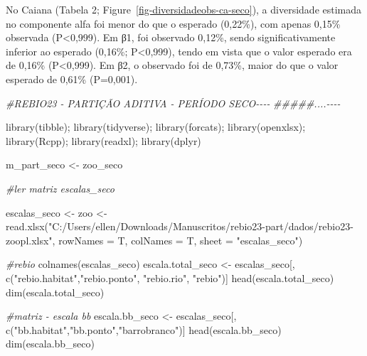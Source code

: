\documentclass[
  letterpaper,
  DIV=11,
  numbers=noendperiod]{scrartcl}
\newenvironment{Shaded}{}{}
\newcommand{\AttributeTok}[1]{\textcolor[rgb]{0.49,0.56,0.16}{#1}}
\newcommand{\CommentTok}[1]{\textcolor[rgb]{0.38,0.63,0.69}{\textit{#1}}}
\newcommand{\DocumentationTok}[1]{\textcolor[rgb]{0.73,0.13,0.13}{\textit{#1}}}
\newcommand{\FunctionTok}[1]{\textcolor[rgb]{0.02,0.16,0.49}{#1}}
\newcommand{\NormalTok}[1]{#1}
\newcommand{\OtherTok}[1]{\textcolor[rgb]{0.00,0.44,0.13}{#1}}
\newcommand{\StringTok}[1]{\textcolor[rgb]{0.25,0.44,0.63}{#1}}
\begin{document}
No Caiana (Tabela 2; Figure~\ref{fig-diversidadeobs-ca-seco}), a
diversidade estimada no componente alfa foi menor do que o esperado
(0,22\%), com apenas 0,15\% observada (P\textless0,999). Em β1, foi
observado 0,12\%, sendo significativamente inferior ao esperado (0,16\%;
P\textless0,999), tendo em vista que o valor esperado era de 0,16\%
(P\textless0,999). Em β2, o observado foi de 0,73\%, maior do que o
valor esperado de 0,61\% (P=0,001).

\begin{Shaded}
\begin{Highlighting}[numbers=left,,]
\CommentTok{\#REBIO23 {-} PARTIÇÃO ADITIVA {-} PERÍODO SECO{-}{-}{-}{-}}
\DocumentationTok{\#\#\#\#\#....{-}{-}{-}{-}}

\FunctionTok{library}\NormalTok{(tibble); }\FunctionTok{library}\NormalTok{(tidyverse); }\FunctionTok{library}\NormalTok{(forcats); }\FunctionTok{library}\NormalTok{(openxlsx); }\FunctionTok{library}\NormalTok{(Rcpp); }\FunctionTok{library}\NormalTok{(readxl); }\FunctionTok{library}\NormalTok{(dplyr)}

\NormalTok{m\_part\_seco }\OtherTok{\textless{}{-}}\NormalTok{ zoo\_seco}

\CommentTok{\#ler matriz escalas\_seco}

\NormalTok{escalas\_seco }\OtherTok{\textless{}{-}}\NormalTok{ zoo }\OtherTok{\textless{}{-}} \FunctionTok{read.xlsx}\NormalTok{(}\StringTok{"C:/Users/ellen/Downloads/Manuscritos/rebio23{-}part/dados/rebio23{-}zoopl.xlsx"}\NormalTok{,}
                                 \AttributeTok{rowNames =}\NormalTok{ T, }\AttributeTok{colNames =}\NormalTok{ T,}
                                 \AttributeTok{sheet =} \StringTok{"escalas\_seco"}\NormalTok{)}

\CommentTok{\#rebio}
\FunctionTok{colnames}\NormalTok{(escalas\_seco)}
\NormalTok{escala.total\_seco }\OtherTok{\textless{}{-}}\NormalTok{ escalas\_seco[, }\FunctionTok{c}\NormalTok{(}\StringTok{"rebio.habitat"}\NormalTok{,}\StringTok{"rebio.ponto"}\NormalTok{, }\StringTok{"rebio.rio"}\NormalTok{, }\StringTok{"rebio"}\NormalTok{)]}
\FunctionTok{head}\NormalTok{(escala.total\_seco)}
\FunctionTok{dim}\NormalTok{(escala.total\_seco)}

\CommentTok{\#matriz {-} escala bb}
\NormalTok{escala.bb\_seco }\OtherTok{\textless{}{-}}\NormalTok{ escalas\_seco[, }\FunctionTok{c}\NormalTok{(}\StringTok{"bb.habitat"}\NormalTok{,}\StringTok{"bb.ponto"}\NormalTok{,}\StringTok{"barrobranco"}\NormalTok{)]}
\FunctionTok{head}\NormalTok{(escala.bb\_seco)}
\FunctionTok{dim}\NormalTok{(escala.bb\_seco)}


\end{Highlighting}
\end{Shaded}
\end{document}
